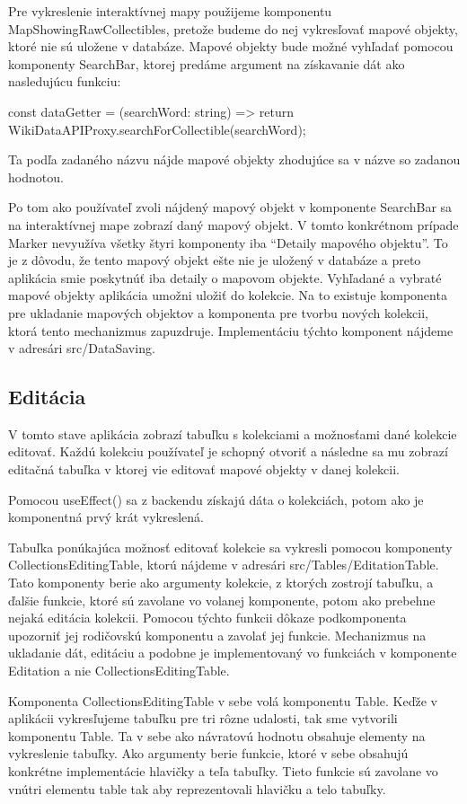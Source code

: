 Pre vykreslenie interaktívnej mapy použijeme komponentu MapShowingRawCollectibles, pretože budeme do nej vykresľovať mapové objekty, ktoré nie sú uložene v databáze. 
Mapové objekty bude možné vyhľadať pomocou komponenty SearchBar, ktorej predáme argument na získavanie dát ako nasledujúcu funkciu: 
\begin{code}
const dataGetter = (searchWord: string) => {
      return WikiDataAPIProxy.searchForCollectible(searchWord);
}
\end{code}
Ta podľa zadaného názvu nájde mapové objekty zhodujúce sa v názve so zadanou hodnotou. 

Po tom ako používateľ zvoli nájdený mapový objekt v komponente SearchBar sa na interaktívnej mape zobrazí daný mapový objekt.  V tomto konkrétnom prípade 
Marker nevyužíva všetky štyri komponenty iba “Detaily mapového objektu”. To je z dôvodu, že tento mapový objekt ešte nie je uložený v databáze a preto aplikácia smie poskytnúť iba detaily o mapovom objekte. 
Vyhľadané a vybraté mapové objekty aplikácia umožni uložiť do kolekcie. Na to existuje komponenta pre ukladanie mapových objektov a komponenta pre tvorbu nových kolekcii, ktorá tento mechanizmus zapuzdruje. Implementáciu týchto komponent nájdeme v adresári src/DataSaving. 

\subsection*{Editácia}
V tomto stave aplikácia zobrazí tabuľku s kolekciami a možnosťami dané kolekcie editovať. Každú kolekciu používateľ je schopný otvoriť a následne sa mu 
zobrazí editačná tabuľka v ktorej vie editovať mapové objekty v danej kolekcii. 

Pomocou useEffect() sa z backendu získajú dáta o kolekciách, potom ako je komponentná prvý krát vykreslená. 

Tabuľka ponúkajúca možnosť editovať kolekcie sa vykresli pomocou komponenty CollectionsEditingTable, ktorú nájdeme v adresári src/Tables/EditationTable. Tato komponenty berie ako argumenty kolekcie, z ktorých zostrojí tabuľku, a  
ďalšie funkcie, ktoré sú zavolane vo volanej komponente, potom ako prebehne nejaká editácia kolekcii. Pomocou týchto funkcii dôkaze podkomponenta upozorniť jej rodičovskú komponentu a zavolať jej funkcie. 
Mechanizmus na ukladanie dát, editáciu a podobne je implementovaný vo funkciách v komponente Editation a nie CollectionsEditingTable. 

Komponenta CollectionsEditingTable v sebe volá komponentu Table. Keďže v aplikácii vykresľujeme tabuľku pre tri rôzne udalosti, tak sme vytvorili komponentu Table. 
Ta v sebe ako návratovú hodnotu obsahuje elementy na vykreslenie tabuľky. Ako argumenty berie funkcie, ktoré v sebe obsahujú konkrétne implementácie hlavičky a teľa tabuľky. Tieto funkcie sú zavolane vo vnútri elementu table tak aby reprezentovali hlavičku a telo tabuľky. 

